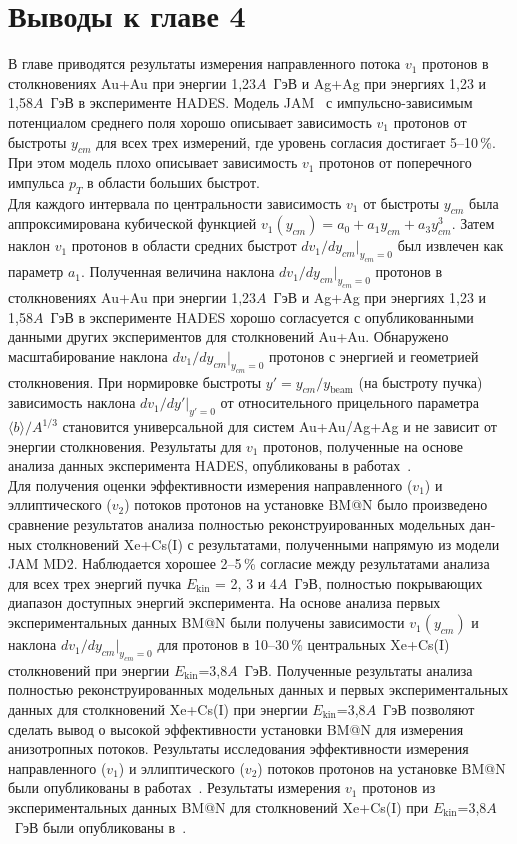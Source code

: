 \section{Выводы к главе 4}
В главе приводятся результаты измерения направленного потока $v_1$ протонов в столкновениях Au+Au при энергии 1,23$A$~ГэВ и Ag+Ag при энергиях 1,23 и 1,58$A$~ГэВ в эксперименте HADES.
Модель JAM~\cite{Zhang:2018wlk, nara2019jam, Nara:2019qfd} с импульсно-зависимым потенциалом среднего поля 
хорошо описывает зависимость $v_1$ протонов от быстроты $y_{cm}$ для всех трех измерений, где уровень согласия  достигает 5--10\,\%. 
При этом модель плохо описывает зависимость $v_1$ протонов 
от поперечного импульса $p_T$ в области больших быстрот.\\
Для каждого интервала по центральности
зависимость  $v_1$  от быстроты $y_{cm}$ была аппроксимирована кубической функцией $v_1(y_{cm}) = a_0 + a_1 y_{cm} + a_3 y_{cm}^3$. 
Затем наклон $v_1$ протонов в области средних быстрот $dv_1/dy_{cm}|_{y_{cm}=0}$ был извлечен как параметр $a_1$.
Полученная величина наклона  $dv_1/dy_{cm}|_{y_{cm}=0}$ протонов в столкновениях Au+Au при энергии 1,23$A$~ГэВ и Ag+Ag при энергиях 
1,23 и 1,58$A$~ГэВ в эксперименте HADES хорошо согласуется с опубликованными  данными других экспериментов для столкновений Au+Au.
Обнаружено масштабирование наклона $dv_1/dy_{cm}|_{y_{cm}=0}$ протонов с энергией и геометрией
столкновения. При нормировке быстроты $y' = y_{cm}/y_{\mathrm{beam}}$ (на быстроту пучка) зависимость  наклона $dv_1/dy'|_{y'=0}$ от  относительного прицельного параметра
 $\langle b \rangle / A^{1/3}$ становится универсальной для систем Au+Au/Ag+Ag и не зависит от энергии столкновения.
Результаты для $v_1$ протонов, полученные на основе анализа данных эксперимента HADES, опубликованы в работах~\cite{HADES:2020lob,Mamaev:2024-1,Mamaev:2024-2}.\\
Для получения оценки эффективности измерения направленного ($v_1$) и эллиптического  ($v_2$) потоков протонов на установке BM@N было произведено
сравнение результатов анализа полностью реконструированных модельных дан­ных столкновений Xe+Cs(I) с результатами, полученными напрямую из модели JAM MD2.
Наблюдается хорошее 2--5\,\% согласие между результатами анализа для всех трех энергий 
пучка $E_{\mathrm{kin}}$ = 2, 3 и 4$A$~ГэВ, полностью покрывающих диапазон доступных энергий эксперимента.
На основе анализа первых экспериментальных данных BM@N  были получены зависимости  $v_1(y_{cm})$ и наклона   $dv_1/dy_{cm}|_{y_{cm}=0}$ для протонов в 10--30\,\% центральных
  Xe+Cs(I) столкновений при энергии $E_{\mathrm{kin}}$=3,8$A$~ГэВ.  
Полученные результаты анализа полностью реконструированных модельных данных и первых
экспериментальных данных для столкновений Xe+Cs(I) при энергии $E_{\mathrm{kin}}$=3,8$A$~ГэВ позволяют сделать вывод о высокой
эффективности установки BM@N  для измерения анизотропных потоков.
Результаты исследования эффективности измерения направленного  ($v_1$) и эллиптического ($v_2$) потоков протонов на 
 установке BM@N были опубликованы в работах~\cite{Mamaev:2024,Mamaev:2023yhz,Mamaev:2023fpr}.
Результаты измерения  $v_1$ протонов из экспериментальных данных BM@N для столкновений Xe+Cs(I) при $E_{\mathrm{kin}}$=3,8$A$~ГэВ были опубликованы в~\cite{doi:10.1142/S021830132441009X}.